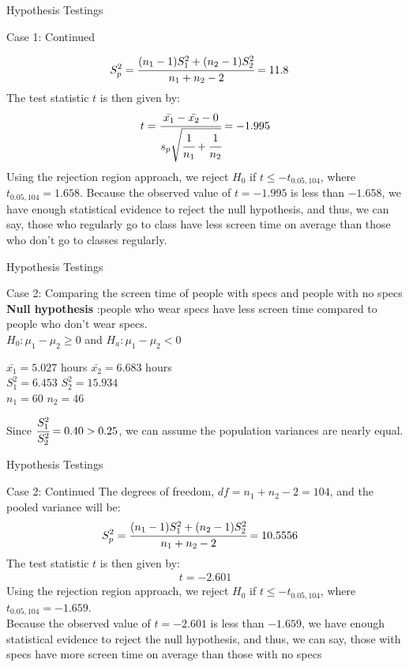 \documentclass{beamer}
\begin{document}
\begin{frame}{Hypothesis Testings}
\begin{block}{Case 1: Continued}

 \begin{align}
     S_p^2 &= \cfrac{(n_1-1)S_1^2 + (n_2-1)S_2^2}{n_1+n_2-2} = 11.8
 \end{align}
The test statistic $t$ is then given by:
\begin{align}
      t &= \cfrac{\bar{x_1} - \bar{x_2} - 0}{s_p\sqrt{\cfrac{1}{n_1} + \cfrac{1}{n_2}}} = -1.995\\ \end{align}
 Using the rejection region approach, we reject $H_0$ if $t \leq -t_{0.05, 104}$, where $t_{0.05,104} =1.658$. 
 Because the observed value of $t=-1.995$ is less than $-1.658$, we have enough statistical evidence to reject the null hypothesis, and thus, we can say, those who regularly go to class have less screen time on average than those who don't go to classes regularly.
\end{block}
\end{frame}

\begin{frame}{Hypothesis Testings}
\begin{block}{Case 2: Comparing the screen time of people with specs and people with no specs}
\textbf{Null hypothesis} :people who wear specs have less screen time compared to people who don't wear specs.\\
  $ H_0 : \mu_1 - \mu_2 \geq 0$ and $H_a : \mu_1 - \mu_2 < 0$
\par
\begin{center}
    $\bar{x_1} = 5.027$ hours \quad $\bar{x_2} = 6.683$ hours \\
    $S^2_1 = 6.453$ \quad
    $S^2_2 = 15.934$ \\
    $n_1 = 60$ \quad
    $n_2 = 46$
\end{center}
Since $\cfrac{S_1^2}{S_2^2} = 0.40 > 0.25$, we can assume the population variances are nearly equal.
\end{block}
\end{frame}

\begin{frame}{Hypothesis Testings}
\begin{block}{Case 2: Continued}
The degrees of freedom, $df = n_1 + n_2 -2 = 104$, and the pooled variance will be:
 \begin{align}
     S_p^2 &= \cfrac{(n_1-1)S_1^2 + (n_2-1)S_2^2}{n_1+n_2-2} = 10.5556
 \end{align}
The test statistic $t$ is then given by:
\begin{align}
      t = -2.601
 \end{align}
Using the rejection region approach, we reject $H_0$ if $t \leq -t_{0.05, 104}$, where $t_{0.05,104} = -1.659$.\\ 
 Because the observed value of $t=-2.601$ is less than $-1.659$, we have enough statistical evidence to reject the null hypothesis, and thus, we can say, those with specs have more screen time on average than those with no specs
\end{block}
\end{frame}
\end{document}
